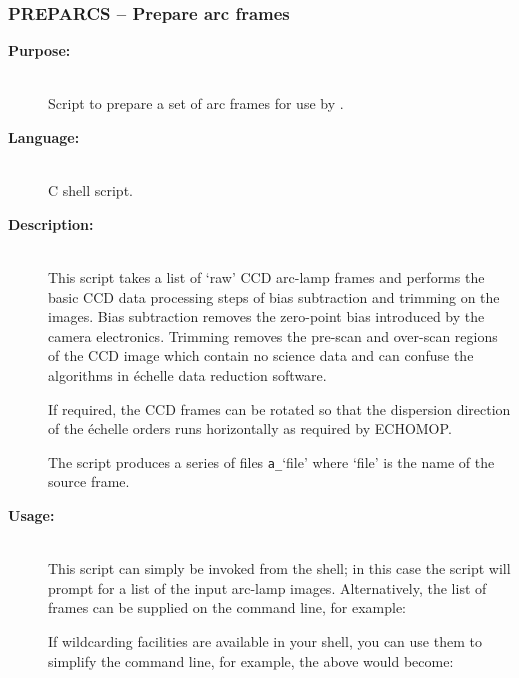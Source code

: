 \documentclass[twoside,11pt]{starlink}
\providecommand{\scspec}[2]{#1}
\begin{document}
\newpage
\subsubsection{\label{se_preparcs}PREPARCS
                \scspec{--}{-} Prepare arc frames}


\begin{description}

\item [\textbf{Purpose:}] \mbox{} \\
     Script to prepare a set of arc frames for use by
     .

\item [\textbf{Language:}] \mbox{} \\
     C shell script.

\item [\textbf{Description:}] \mbox{} \\
     This script takes a list of `raw' CCD arc-lamp frames and performs
     the basic CCD data processing steps of bias subtraction and trimming
     on the images.  Bias subtraction removes the zero-point bias
     introduced by the camera electronics.  Trimming removes the pre-scan
     and over-scan regions of the CCD image which contain no science data
     and can confuse the algorithms in \'{e}chelle data reduction software.

     If required, the CCD frames can be rotated so that the dispersion
     direction of the \'{e}chelle orders runs horizontally as required by
     ECHOMOP.

     The script produces a series of files \verb+a_+`file' where `file'
     is the name of the source frame.

\item [\textbf{Usage:}] \mbox{} \\
     This script can simply be invoked from the shell; in this case
     the script will prompt for a list of the input arc-lamp images.
     Alternatively, the list of frames can be supplied on the
     command line, for example:

\begin{terminalv}
\end{terminalv}

     If wildcarding facilities are available in your shell, you can use
     them to simplify the command line, for example, the above would
     become:


\end{description}
\end{document}
